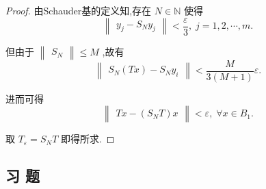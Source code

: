 \documentclass[lang=cn,newtx,10pt,scheme=chinese,thmcnt=chapter]{elegantbook}
\begin{document}
\begin{proof}
由Schauder基的定义知,存在 \(N \in  \mathbb{N}\) 使得
\begin{equation*}
\begin{Vmatrix}{{y}_{j} - {S}_{N}{y}_{j}}\end{Vmatrix} < \frac{\varepsilon }{3},\;j = 1,2,\cdots ,m.
\end{equation*}

但由于 \(\begin{Vmatrix}{S}_{N}\end{Vmatrix} \leqslant  M\) ,故有
\begin{equation*}
\begin{Vmatrix}{{S}_{N}\left( {Tx}\right)  - {S}_{N}{y}_{i}}\end{Vmatrix} < \frac{M}{3\left( {M + 1}\right) }\varepsilon .
\end{equation*}

进而可得
\begin{equation*}
\begin{Vmatrix}{{Tx} - \left( {{S}_{N}T}\right) x}\end{Vmatrix} < \varepsilon ,\;\forall x \in  {B}_{1}.
\end{equation*}

取 \({T}_{\varepsilon } = {S}_{N}T\) 即得所求.

\end{proof}

\subsection{习 题}
\end{document}
